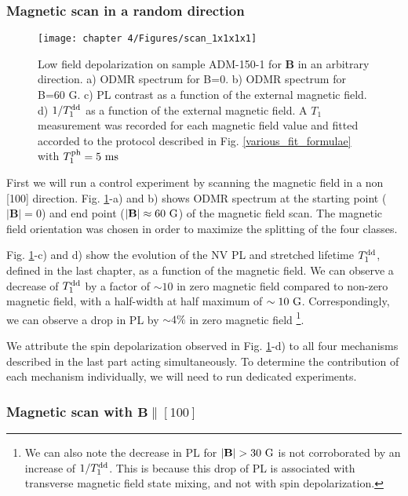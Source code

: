 \documentclass[a4paper, 11pt]{report}
\begin{document}
\subsubsection{Magnetic scan in a random direction}

\begin{figure}[h]
\centering
\texttt{[image: chapter 4/Figures/scan\_1x1x1x1]}
\caption{Low field depolarization on sample ADM-150-1 for $\mathbf{B}$ in an arbitrary direction. a) ODMR spectrum for B=0. b) ODMR spectrum for B=60 G. c) PL contrast as a function of the external magnetic field. d) $1/T_1^{\rm dd}$ as a function of the external magnetic field. A $T_1$ measurement was recorded for each magnetic field value and fitted accorded to the protocol described in Fig. \ref{various_fit_formulae} with $T_1^{\rm ph}=5\ \rm ms$}
\label{scan 1x1x1x1}
\end{figure}

First we will run a control experiment by scanning the magnetic field in a non [100] direction. Fig. \ref{scan 1x1x1x1}-a) and b) shows ODMR spectrum at the starting point ($|\mathbf{B}|=0$) and end point ($|\mathbf{B}|\approx 60\ \rm G$) of the magnetic field scan. The magnetic field orientation was chosen in order to maximize the splitting of the four classes.

Fig. \ref{scan 1x1x1x1}-c) and d) show the evolution of the NV PL and stretched lifetime $T_1^{\rm dd}$, defined in the last chapter, as a function of the magnetic field. We can observe a decrease of $T_1^{\rm dd}$ by a factor of $\sim 10$ in zero magnetic field compared to non-zero magnetic field, with a half-width at half maximum of $\sim 10\ \rm G$. Correspondingly, we can observe a drop in PL by $\sim 4\%$ in zero magnetic field \footnote{We can also note the decrease in PL for $|\mathbf{B}|> 30\ \rm G$ is not corroborated by an increase of $1/T_1^{\rm dd}$. This is because this drop of PL is associated with transverse magnetic field state mixing, and not with spin depolarization.}. 

We attribute the spin depolarization observed in Fig. \ref{scan 1x1x1x1}-d) to all four mechanisms described in the last part acting simultaneously. To determine the contribution of each mechanism individually, we will need to run dedicated experiments.

\subsubsection{Magnetic scan with $\mathbf{B} \parallel [100]$}
\end{document}
